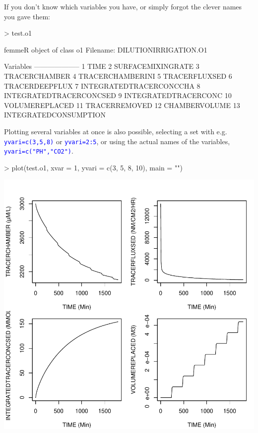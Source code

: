 \documentclass{scrartcl}
\newcommand{\Rcode}[1]{\texttt{\textcolor{blue}{#1}}}
\begin{document}
If you don't know which variables you have, or simply forgot the
clever names you gave them:

\begin{Schunk}
\begin{Sinput}
> test.o1
\end{Sinput}
\begin{Soutput}
femmeR object of class o1
Filename: DILUTIONIRRIGATION.O1 

Variables
--------------------
1 TIME 
2 SURFACEMIXINGRATE 
3 TRACERCHAMBER 
4 TRACERCHAMBERINI 
5 TRACERFLUXSED 
6 TRACERDEEPFLUX 
7 INTEGRATEDTRACERCONCCHA 
8 INTEGRATEDTRACERCONCSED 
9 INTEGRATEDTRACERCONC 
10 VOLUMEREPLACED 
11 TRACERREMOVED 
12 CHAMBERVOLUME 
13 INTEGRATEDCONSUMPTION 
\end{Soutput}
\end{Schunk}

Plotting several variables at once is also possible, selecting a set
with e.g. \Rcode{yvari=c(3,5,8)} or \Rcode{yvari=2:5}, or using
the actual names of the variables, \Rcode{yvari=c("PH","CO2")}.

\begin{Schunk}
\begin{Sinput}
> plot(test.o1, xvar = 1, yvari = c(3, 5, 8, 10), main = "")
\end{Sinput}
\end{Schunk}
\includegraphics{figures/f-008}
\end{document}
